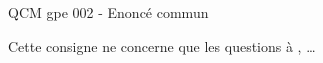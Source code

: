 \begin{EnonceCommunQCM}    
    QCM gpe 002 - Enoncé commun

    Cette consigne ne concerne que les questions  à , \ldots
\end{EnonceCommunQCM}
